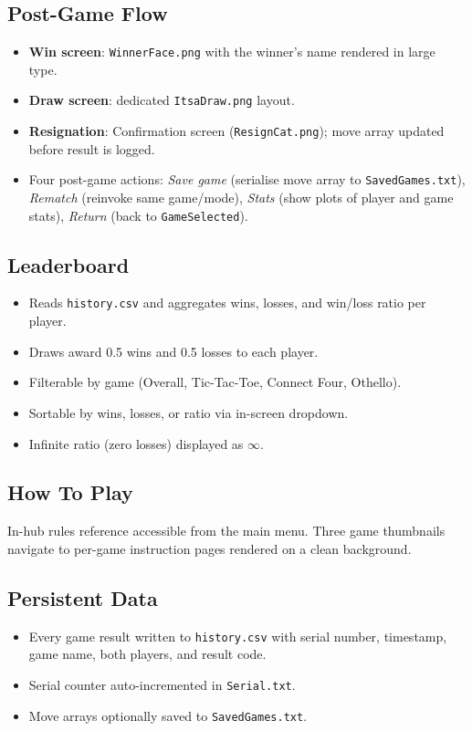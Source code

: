 \documentclass[12pt,a4paper]{article}
\begin{document}
\subsection{Post-Game Flow}
\begin{itemize}[leftmargin=2em]
  \item \textbf{Win screen}: \texttt{WinnerFace.png} with the winner's name rendered in large type.
  \item \textbf{Draw screen}: dedicated \texttt{ItsaDraw.png} layout.
  \item \textbf{Resignation}: Confirmation screen (\texttt{ResignCat.png}); move array updated before result is logged.
  \item Four post-game actions: \textit{Save game} (serialise move array to \texttt{SavedGames.txt}), \textit{Rematch} (reinvoke same game/mode), \textit{Stats} (show plots of player and game stats), \textit{Return} (back to \texttt{GameSelected}).
\end{itemize}

\subsection{Leaderboard}
\begin{itemize}[leftmargin=2em]
  \item Reads \texttt{history.csv} and aggregates wins, losses, and win/loss ratio per player.
  \item Draws award 0.5 wins and 0.5 losses to each player.
  \item Filterable by game (Overall, Tic-Tac-Toe, Connect Four, Othello).
  \item Sortable by wins, losses, or ratio via in-screen dropdown.
  \item Infinite ratio (zero losses) displayed as $\infty$.
\end{itemize}

\subsection{How To Play}
In-hub rules reference accessible from the main menu. Three game thumbnails navigate to per-game instruction pages rendered on a clean background.

\subsection{Persistent Data}
\begin{itemize}[leftmargin=2em]
  \item Every game result written to \texttt{history.csv} with serial number, timestamp, game name, both players, and result code.
  \item Serial counter auto-incremented in \texttt{Serial.txt}.
  \item Move arrays optionally saved to \texttt{SavedGames.txt}.
\end{itemize}
\end{document}
